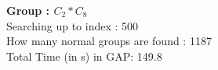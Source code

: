 \textbf{Group : $C_2*C_8$}\\
Searching up to index : 500\\
How many normal groups are found : 1187\\
Total Time (in s) in GAP: 149.8\\
